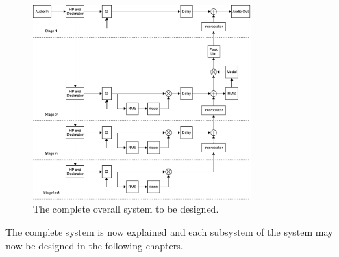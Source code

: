 \begin{figure}[H]
\centering
\includegraphics[width=0.75\textwidth]{figures/designRealFull.pdf}
\caption{The complete overall system to be designed.}
\label{fig:designRealBlock}
\end{figure}

The complete system is now explained and each subsystem of the system may now be designed in the following chapters.
